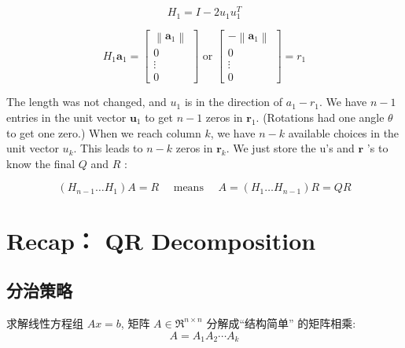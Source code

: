 \begin{example}[Reflection by $H_1$]
    \begin{equation}H_1 = I - 2 u_1 u_1^T\end{equation}

    \begin{equation}H_{1} \boldsymbol{a}_{1}=\left[\begin{array}{c}
        \left\|\boldsymbol{a}_{1}\right\| \\
        0 \\
        \vdots \\
        0
        \end{array}\right] \text { or }\left[\begin{array}{c}
        -\left\|\boldsymbol{a}_{1}\right\| \\
        0 \\
        \vdots \\
        0
        \end{array}\right]=r_{1}\end{equation}


The length was not changed, and $u_{1}$ is in the direction of $a_{1}-r_{1}$. We have $n-1$ entries in the unit vector $\boldsymbol{u}_{1}$ to get $n-1$ zeros in $\boldsymbol{r}_{1}$. (Rotations had one angle $\theta$ to get one zero.) When we reach column $k$, we have $n-k$ available choices in the unit vector $u_{k}$. This leads to $n-k$ zeros in $\boldsymbol{r}_{k}$. We just store the u's and $\boldsymbol{r}$ 's to know the final $Q$ and $R$ :

\begin{theorem}[$H$的逆是它本身]
    \begin{equation}
\left(H_{n-1} \ldots H_{1}\right) A=R \quad \text { means }  \quad A=\left(H_{1} \ldots H_{n-1}\right) R=Q R
\end{equation}
\end{theorem}

\end{example}


\section{Recap： QR Decomposition}

\subsection{分治策略}

求解线性方程组 $ A x=b $, 矩阵 $ A \in \mathfrak{R}^{n \times n} $ 分解成“结构简单” 的矩阵相乘:
\begin{equation}
A=A_{1} A_{2} \cdots A_{k}
\end{equation}

